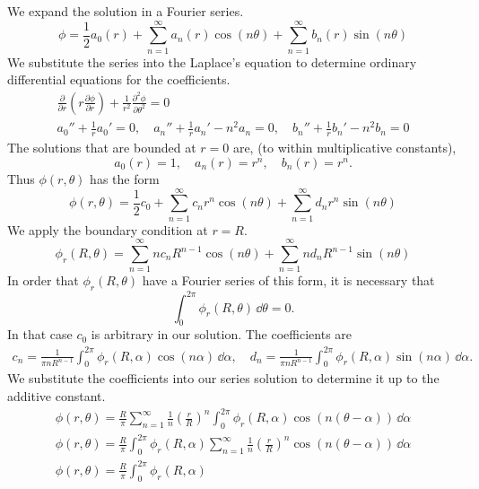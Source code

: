{%
\begin{Solution}
  \label{solution poisson formula neumann}
  We expand the solution in a Fourier series.
  \[
  \phi = \frac{1}{2} a_0(r) 
  + \sum_{n=1}^\infty a_n(r) \cos(n \theta)
  + \sum_{n=1}^\infty b_n(r) \sin(n \theta)
  \]
  We substitute the series into the Laplace's equation to determine
  ordinary differential equations for the coefficients.
  \begin{gather*}
    \frac{\partial}{\partial r} \left( r \frac{\partial \phi}{\partial r} \right)
    + \frac{1}{r^2} \frac{\partial^2 \phi}{\partial \theta^2} = 0 \\
    a_0'' + \frac{1}{r} a_0' = 0, \quad
    a_n'' + \frac{1}{r} a_n' - n^2 a_n = 0, \quad
    b_n'' + \frac{1}{r} b_n' - n^2 b_n = 0
  \end{gather*}
  The solutions that are bounded at $r = 0$ are, (to within
  multiplicative constants),
  \[
  a_0(r) = 1, \quad a_n(r) = r^n, \quad b_n(r) = r^n.
  \]
  Thus $\phi(r,\theta)$ has the form
  \[
  \phi(r,\theta) = \frac{1}{2} c_0 
  + \sum_{n=1}^\infty c_n r^n \cos(n \theta)
  + \sum_{n=1}^\infty d_n r^n \sin(n \theta)
  \]
  We apply the boundary condition at $r = R$.
  \[
  \phi_r(R,\theta) = \sum_{n=1}^\infty n c_n R^{n-1} \cos(n \theta)
  + \sum_{n=1}^\infty n d_n R^{n-1} \sin(n \theta) 
  \]
  In order that $\phi_r(R,\theta)$ have a Fourier series of this form,
  it is necessary that
  \[
  \int_0^{2 \pi} \phi_r(R,\theta) \,\dd \theta = 0.
  \]
  In that case $c_0$ is arbitrary in our solution.
  The coefficients are
  \begin{gather*}
    c_n = \frac{1}{\pi n R^{n-1}} \int_0^{2 \pi} \phi_r(R,\alpha) 
    \cos(n \alpha) \,\dd \alpha, \quad
    d_n = \frac{1}{\pi n R^{n-1}} \int_0^{2 \pi} \phi_r(R,\alpha) 
    \sin(n \alpha) \,\dd \alpha.
  \end{gather*}
  We substitute the coefficients into our series solution to determine
  it up to the additive constant.
  \begin{gather*}
    \phi(r,\theta) = \frac{R}{\pi} \sum_{n=1}^\infty \frac{1}{n}
    \left( \frac{r}{R} \right)^n \int_0^{2 \pi} 
    \phi_r(R,\alpha) \cos(n (\theta-\alpha)) \,\dd \alpha \\
    \phi(r,\theta) = \frac{R}{\pi} \int_0^{2 \pi} \phi_r(R,\alpha) 
    \sum_{n=1}^\infty \frac{1}{n} \left( \frac{r}{R} \right)^n 
    \cos(n (\theta-\alpha)) \,\dd \alpha \\
    \phi(r,\theta) = \frac{R}{\pi} \int_0^{2 \pi} \phi_r(R,\alpha) 

\end{gather*}
\end{Solution}}
